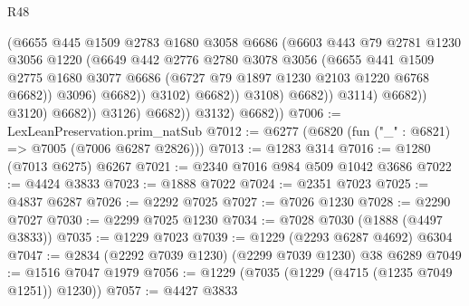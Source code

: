 \begin{lexlean}{R48}
\begin{coremodule}
                                        (@6655
                                          @445
                                          @1509
                                          @2783
                                          @1680
                                          @3058
                                          @6686
                                          (@6603
                                            @443
                                            @79
                                            @2781
                                            @1230
                                            @3056
                                            @1220
                                            (@6649
                                              @442
                                              @2776
                                              @2780
                                              @3078
                                              @3056
                                              (@6655
                                                @441
                                                @1509
                                                @2775
                                                @1680
                                                @3077
                                                @6686
                                                (@6727 @79 @1897 @1230 @2103 @1220 @6768 @6682))
                                              @3096)
                                            @6682))
                                        @3102)
                                      @6682))
                                  @3108)
                                @6682))
                            @3114)
                          @6682))
                      @3120)
                    @6682))
                @3126)
              @6682))
          @3132)
        @6682))
@7006 := LexLeanPreservation.prim_natSub
@7012 := @6277 (@6820 (fun ("_" : @6821) => @7005 (@7006 @6287 @2826)))
@7013 := @1283 @314
@7016 := @1280 (@7013 @6275) @6267
@7021 := @2340 @7016 @984 @509 @1042 @3686
@7022 := @4424 @3833
@7023 := @1888 @7022
@7024 := @2351 @7023
@7025 := @4837 @6287
@7026 := @2292 @7025
@7027 := @7026 @1230
@7028 := @2290 @7027
@7030 := @2299 @7025 @1230
@7034 := @7028 @7030 (@1888 (@4497 @3833))
@7035 := @1229 @7023
@7039 := @1229 (@2293 @6287 @4692) @6304
@7047 := @2834 (@2292 @7039 @1230) (@2299 @7039 @1230) @38 @6289
@7049 := @1516 @7047 @1979
@7056 := @1229 (@7035 (@1229 (@4715 (@1235 @7049 @1251)) @1230))
@7057 := @4427 @3833

\end{coremodule}
\end{lexlean}
